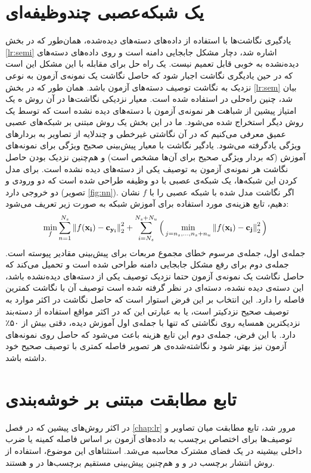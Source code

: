 \section{یک شبکه‌عصبی چندوظیفه‌ای}
یادگیری نگاشت‌ها با استفاده از داده‌های دسته‌های دیده‌شده، همان‌طور که در بخش \ref{lr:semi} اشاره شد، دچار مشکل جابجایی دامنه است و  روی داده‌های دسته‌های دیده‌نشده به خوبی قابل تعمیم نیست. یک راه حل برای مقابله با این مشکل این است که در حین یادیگری نگاشت اجبار شود که حاصل نگاشت یک نمونه‌ی آزمون به نوعی نزدیک به نگاشت توصیف دسته‌های آزمون باشد. همان ‌طور که در بخش 
\ref{lr:sem}
بیان شد، چنین راه‌حلی در 
\cite{Kodirov2015}
استفاده شده است. معیار نزدیکی نگاشت‌ها در آن روش ه یک امتیاز پیشین از شباهت هر نمونه‌ی آزمون با دسته‌های دیده نشده است که  توسط یک روش دیگر استخراج شده می‌شود. ما در این بخش یک روش مبتنی بر شبکه‌های عصبی عمیق معرفی می‌کنیم که در آن نگاشتی غیرخطی و چندلایه از تصاویر به بردارهای ویژگی یادگرفته می‌شود. یادگیر نگاشت با معیار پیش‌بینی صحیح ویژگی برای نمونه‌های آموزش (که بردار ویژگی صحیح برای آن‌ها مشخص است) و هم‌چنین نزدیک بودن حاصل نگاشت هر نمونه‌ی آزمون به توصیف یکی از دسته‌های دیده نشده است. برای مدل کردن این شبکه‌ها، یک شبکه‌ی عصبی با دو وظیفه طراحی شده است که دو ورودی و دو خروجی دارد (تصویر \ref{fig:nn}). اگر نگاشت مدل شده با شبکه عصبی را با $f$ نشان دهیم، تابع هزینه‌ی مورد استفاده برای آموزش شبکه به صورت زیر تعریف می‌شود:
\begin{equation}
\label{eq:nn_loss}
\min_{f} \sum_{n=1}^{N_s} \left \lVert f(\mathbf{x_i}) - \mathbf{c_{y_i}} \right \rVert_2^2 + \sum_{i=N_s}^{N_s+N_u} \Big ( \min_{j=n_s,\ldots,n_s + n_u} \left \lVert f(\mathbf{x_i) - c_j} \right \rVert_2^2 \Big )
\end{equation}
جمله‌ی اول، جمله‌ی مرسوم خطای مجموع مربعات برای پیش‌بینی مقادیر پیوسته است. جمله‌ی دوم برای رفع مشکل جابجایی دامنه طراحی شده است و تحمیل می‌کند که حاصل نگاشت یک نمونه‌ی آزمون حتما نزدیک توصیف یکی از دسته‌های دیده‌نشده باشد، این دسته‌ی دیده نشده، دسته‌ای در نظر گرفته شده است توصیف آن با نگاشت کمترین فاصله را دارد. این انتخاب بر این فرض استوار است که حاصل نگاشت در اکثر موارد به توصیف صحیح نزدکیتر است، یا به عبارتی این که در اکثر مواقع استفاده از دسته‌بند نزدیکترین همسایه روی نگاشتی که تنها با جمله‌ی اول آموزش دیده، دقتی بیش از ۵۰٪ دارد. با این فرض، جمله‌ی دوم این تابع هزینه باعث می‌شود که حاصل روی نمونه‌های آزمون نیز بهتر شود و نگاشته‌شده‌ی هر تصویر فاصله کمتری با توصیف صحیح خود داشته باشد.

\section{ تابع مطابقت مبتنی بر خوشه‌بندی }\label{compatibility_funcion}
در اکثر روش‌های پیشین که در فصل \ref{chap:lr} مرور شد، تابع مطابقت میان تصاویر و توصیف‌ها برای اختصاص برچسب به داده‌های آزمون بر اساس فاصله کمینه یا ضرب داخلی بیشینه در یک فضای مشترک محاسبه می‌شد. استثناهای این موضوع، استفاده از روش انتشار برچسب در \cite{Fu2014} و \cite{Kodirov2015} و هم‌چنین پیش‌بینی مستقیم برچسب‌ها در
\cite{li15max}
و
\cite{semi15}
هستند.

